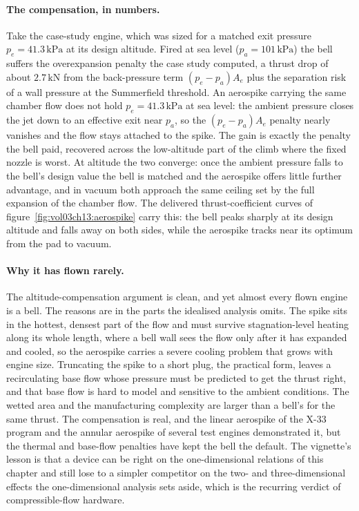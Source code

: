 \paragraph{The compensation, in numbers.} Take the case-study engine,
which was sized for a matched exit pressure $p_e = 41.3\,\text{kPa}$ at
its design altitude. Fired at sea level ($p_a = 101\,\text{kPa}$) the
bell suffers the overexpansion penalty the case study computed, a
thrust drop of about $2.7\,\text{kN}$ from the back-pressure term
$(p_e - p_a)A_e$ plus the separation risk of a wall pressure at the
Summerfield threshold. An aerospike carrying the same chamber flow does
not hold $p_e = 41.3\,\text{kPa}$ at sea level: the ambient pressure
closes the jet down to an effective exit near $p_a$, so the
$(p_e - p_a)A_e$ penalty nearly vanishes and the flow stays attached to
the spike. The gain is exactly the penalty the bell paid, recovered
across the low-altitude part of the climb where the fixed nozzle is
worst. At altitude the two converge: once the ambient pressure falls to
the bell's design value the bell is matched and the aerospike offers
little further advantage, and in vacuum both approach the same ceiling
set by the full expansion of the chamber flow. The delivered
thrust-coefficient curves of figure~\ref{fig:vol03ch13:aerospike} carry
this: the bell peaks sharply at its design altitude and falls away on
both sides, while the aerospike tracks near its optimum from the pad to
vacuum.



\paragraph{Why it has flown rarely.} The altitude-compensation argument
is clean, and yet almost every flown engine is a bell. The reasons are
in the parts the idealised analysis omits. The spike sits in the
hottest, densest part of the flow and must survive stagnation-level
heating along its whole length, where a bell wall sees the flow only
after it has expanded and cooled, so the aerospike carries a severe
cooling problem that grows with engine size. Truncating the spike to a
short plug, the practical form, leaves a recirculating base flow whose
pressure must be predicted to get the thrust right, and that base flow
is hard to model and sensitive to the ambient conditions. The wetted
area and the manufacturing complexity are larger than a bell's for the
same thrust. The compensation is real, and the linear aerospike of the
X-33 program and the annular aerospike of several test engines
demonstrated it, but the thermal and base-flow penalties have kept the
bell the default. The vignette's lesson is that a device can be right on
the one-dimensional relations of this chapter and still lose to a
simpler competitor on the two- and three-dimensional effects the
one-dimensional analysis sets aside, which is the recurring verdict of
compressible-flow hardware.

